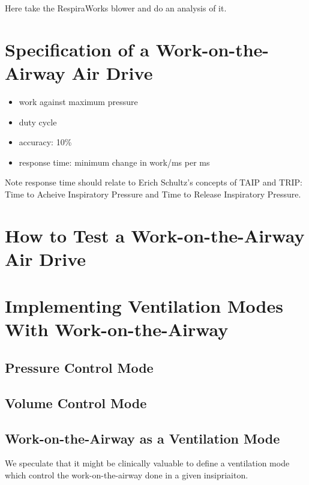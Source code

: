 \documentclass{article}
\begin{document}
Here take the RespiraWorks blower and do an analysis of it.


\section{Specification of a Work-on-the-Airway Air Drive}

\begin{itemize}
\item{work against maximum pressure}
\item{duty cycle}
\item{accuracy: 10\%}
\item{response time: minimum change in work/ms per ms}
\end{itemize}

Note response time should relate to Erich Schultz's concepts of
TAIP and TRIP: Time to Acheive Inspiratory Pressure and
Time to Release Inspiratory Pressure.

\section{How to Test a  Work-on-the-Airway Air Drive}



\section{Implementing Ventilation Modes With Work-on-the-Airway}

\subsection{Pressure Control Mode}
\subsection{Volume Control Mode}


\subsection{Work-on-the-Airway as a Ventilation Mode}

We speculate that it might be clinically valuable to
define a ventilation mode which control the work-on-the-airway
done in a given insipriaiton.





\end{document}
